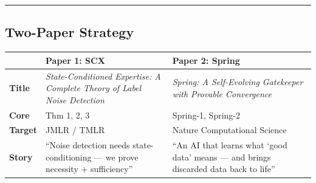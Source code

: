 \documentclass[
  12pt,
]{article}
\begin{document}
\begin{center}\rule{0.5\linewidth}{0.5pt}\end{center}

\subsection{Two-Paper Strategy}\label{two-paper-strategy}

\begin{longtable}[]{@{}
  >{\raggedright\arraybackslash}p{}
  >{\raggedright\arraybackslash}p{}
  >{\raggedright\arraybackslash}p{}@{}}
\toprule\noalign{}
\begin{minipage}[b]{\linewidth}\raggedright
\end{minipage} & \begin{minipage}[b]{\linewidth}\raggedright
Paper 1: SCX
\end{minipage} & \begin{minipage}[b]{\linewidth}\raggedright
Paper 2: Spring
\end{minipage} \\
\midrule\noalign{}
\endhead
\bottomrule\noalign{}
\endlastfoot
\textbf{Title} & \emph{State-Conditioned Expertise: A Complete Theory of
Label Noise Detection} & \emph{Spring: A Self-Evolving Gatekeeper with
Provable Convergence} \\
\textbf{Core} & Thm 1, 2, 3 & Spring-1, Spring-2 \\
\textbf{Target} & JMLR / TMLR & Nature Computational Science \\
\textbf{Story} & ``Noise detection needs state-conditioning --- we prove
necessity + sufficiency'' & ``An AI that learns what `good data' means
--- and brings discarded data back to life'' \\
\end{longtable}
\end{document}
